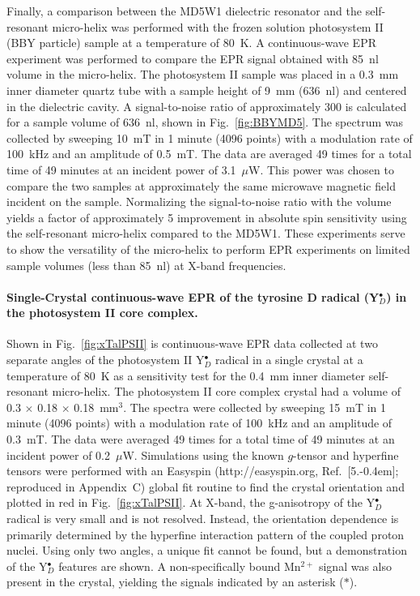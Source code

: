 Finally, a comparison between the MD5W1 dielectric resonator and the self-resonant micro-helix was performed with the frozen solution photosystem II (BBY particle) sample at a temperature of 80~K. A continuous-wave EPR experiment was performed to compare the EPR signal obtained with 85~nl volume in the micro-helix. The photosystem II sample was placed in a 0.3~mm inner diameter quartz tube with a sample height of 9~mm (636~nl) and centered in the dielectric cavity. A signal-to-noise ratio of approximately 300 is calculated for a sample volume of 636~nl, shown in Fig.~\ref{fig:BBYMD5}. The spectrum was collected by sweeping 10~mT in 1 minute (4096 points) with a modulation rate of 100~kHz and an amplitude of 0.5~mT. The data are averaged 49 times for a total time of 49 minutes at an incident power of 3.1~$\mu$W. This power was chosen to compare the two samples at approximately the same microwave magnetic field incident on the sample. Normalizing the signal-to-noise ratio with the volume yields a factor of approximately 5 improvement in absolute spin sensitivity using the self-resonant micro-helix compared to the MD5W1. These experiments serve to show the versatility of the micro-helix to perform EPR experiments on limited sample volumes (less than 85~nl) at X-band frequencies.

\paragraph{Single-Crystal continuous-wave EPR of the tyrosine D radical (Y$_D^\bullet$) in the photosystem II core complex.}
Shown in Fig.~\ref{fig:xTalPSII} is continuous-wave EPR data collected at two separate angles of the photosystem II Y$_D^\bullet$ radical in a single crystal at a temperature of 80~K as a sensitivity test for the 0.4~mm inner diameter self-resonant micro-helix. The photosystem II core complex crystal had a volume of 0.3 $\times$ 0.18 $\times$ 0.18~mm$^3$. The spectra were collected by sweeping 15~mT in 1 minute (4096 points) with a modulation rate of 100~kHz and an amplitude of 0.3~mT. The data were averaged 49 times for a total time of 49 minutes at an incident power of 0.2~$\mu$W. Simulations using the known $g$-tensor and hyperfine tensors \cite{Hofbauer6623} were performed with an Easyspin (http://easyspin.org, Ref.~[5.\kern-0.4em]; reproduced in Appendix~C) global fit routine to find the crystal orientation and plotted in red in Fig.~\ref{fig:xTalPSII}. At X-band, the g-anisotropy of the Y$_D^\bullet$ radical is very small and is not resolved. Instead, the orientation dependence is primarily determined by the hyperfine interaction pattern of the coupled proton nuclei. \cite{Hofbauer6623} Using only two angles, a unique fit cannot be found, but a demonstration of the Y$_D^\bullet$ features are shown. A non-specifically bound Mn$^{2+}$ signal was also present in the crystal, yielding the signals indicated by an asterisk (\mbox{\large $\ast$}). 

